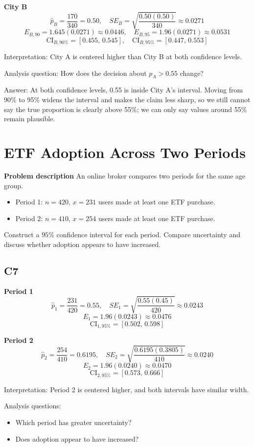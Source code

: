 	\textbf{City B}
	\[
	\hat p_B=\frac{170}{340}=0.50,
	\quad SE_B=\sqrt{\frac{0.50(0.50)}{340}}\approx 0.0271
	\]
	\[
	E_{B,90}=1.645(0.0271)\approx 0.0446,
	\quad E_{B,95}=1.96(0.0271)\approx 0.0531
	\]
	\[
	\text{CI}_{B,90\%}=[0.455,\,0.545],
	\quad \text{CI}_{B,95\%}=[0.447,\,0.553]
	\]
	
	Interpretation: City A is centered higher than City B at both confidence levels.
	
	Analysis question: How does the decision about \(p_A>0.55\) change?
	
	Answer: At both confidence levels, 0.55 is inside City A's interval. Moving from 90\% to 95\% widens the interval and makes the claim less sharp, so we still cannot say the true proportion is clearly above 55\%; we can only say values around 55\% remain plausible.
	
	\section{ETF Adoption Across Two Periods}
	\textbf{Problem description}
	An online broker compares two periods for the same age group.
	\begin{itemize}
		\item Period 1: \(n=420\), \(x=231\) users made at least one ETF purchase.
		\item Period 2: \(n=410\), \(x=254\) users made at least one ETF purchase.
	\end{itemize}
	Construct a \(95\%\) confidence interval for each period. Compare uncertainty and discuss whether adoption appears to have increased.
	
	\subsection*{C7}
	\textbf{Period 1}
	\[
	\hat p_1=\frac{231}{420}=0.55,
	\quad SE_1=\sqrt{\frac{0.55(0.45)}{420}}\approx 0.0243
	\]
	\[
	E_1=1.96(0.0243)\approx 0.0476
	\]
	\[
	\text{CI}_{1,95\%}=[0.502,\,0.598]
	\]
	
	\textbf{Period 2}
	\[
	\hat p_2=\frac{254}{410}=0.6195,
	\quad SE_2=\sqrt{\frac{0.6195(0.3805)}{410}}\approx 0.0240
	\]
	\[
	E_2=1.96(0.0240)\approx 0.0470
	\]
	\[
	\text{CI}_{2,95\%}=[0.573,\,0.666]
	\]
	
	Interpretation: Period 2 is centered higher, and both intervals have similar width.
	
	Analysis questions:
	\begin{itemize}
		\item Which period has greater uncertainty?
		\item Does adoption appear to have increased?
	\end{itemize}
	

